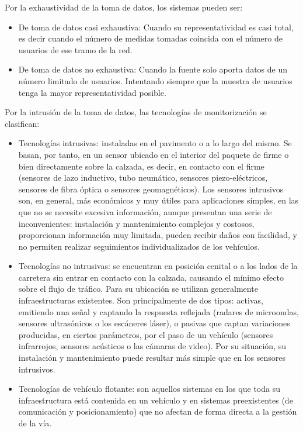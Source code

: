 \documentclass[twocolumn,twoside]{Jornadas}
\begin{document}
Por la exhaustividad de la toma de datos, los sistemas pueden ser:

\begin{itemize}

 \item De toma de datos casi exhaustiva: Cuando su representatividad es casi total, es decir cuando el número de medidas tomadas coincida con el número de 
usuarios de ese tramo de la red.

 \item De toma de datos no exhaustiva: Cuando la fuente solo aporta datos de un número limitado de usuarios. Intentando siempre que la muestra de usuarios tenga la mayor representatividad posible.
 
\end{itemize}

Por la intrusión de la toma de datos, las tecnologías de monitorización se clasifican:

\begin{itemize}
 \item Tecnologías intrusivas: instaladas en el pavimento o a lo largo del mismo. Se basan, por tanto, en un sensor ubicado en el interior del 
paquete de firme o bien directamente sobre la calzada, es decir, en contacto con el firme (sensores de lazo inductivo, tubo neumático, 
sensores piezo-eléctricos, sensores de fibra óptica o sensores geomagnéticos). Los sensores intrusivos son, en general, más económicos 
y muy útiles para aplicaciones simples, en las que no se necesite excesiva información, aunque presentan una serie de inconvenientes: instalación y mantenimiento complejos y costosos, proporcionan información muy limitada, pueden recibir daños con facilidad, y no permiten realizar seguimientos individualizados de los vehículos.

 \item Tecnologías no intrusivas: se encuentran en posición cenital o a los lados de la carretera sin entrar en contacto con la calzada, 
causando el mínimo efecto sobre el flujo de tráfico. Para su ubicación se utilizan generalmente infraestructuras existentes. 
Son principalmente de dos tipos: activas, emitiendo una señal y captando la respuesta reflejada (radares de microondas, 
sensores ultrasónicos o los escáneres láser), o pasivas que captan variaciones producidas, en ciertos parámetros, 
por el paso de un vehículo (sensores infrarrojos, sensores acústicos o las cámaras de video). 
Por su situación, su instalación y mantenimiento puede resultar más simple que en los sensores intrusivos.

 \item Tecnologías de vehículo flotante: son aquellos sistemas en los que toda su infraestructura está contenida en un vehículo y en sistemas preexistentes (de comunicación y posicionamiento) que no afectan de forma directa a la gestión de la vía.

\end{itemize}
\end{document}
